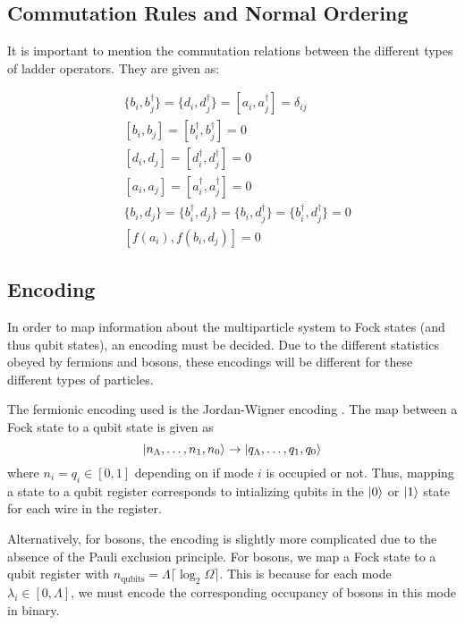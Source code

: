 \subsection{Commutation Rules and Normal Ordering}
\label{subsec:commutation}
It is important to mention the commutation relations between the different types of ladder operators. They are given as:

\begin{align*}
    &\{b_i, b_j^\dagger\} = \{d_i, d_j^\dagger\} = [a_i, a_j^\dagger] = \delta_{ij}\\
    & [b_i, b_j] = [b_i^\dagger, b_j^\dagger] = 0 \\
    & [d_i, d_j] = [d_i^\dagger, d_j^\dagger] = 0 \\
    & [a_i, a_j] = [a_i^\dagger, a_j^\dagger] = 0 \\
    & \{b_i, d_j\} = \{b_i^\dagger, d_j\} = \{b_i, d_j^\dagger\} = \{b_i^\dagger, d_j^\dagger\} = 0\\
    & [f(a_i), f(b_i, d_j)] = 0
\end{align*}

\subsection{Encoding}
\label{subsec:encoding}
In order to map information about the multiparticle system to Fock states (and thus qubit states), an encoding must be decided. Due to the different statistics obeyed by fermions and bosons, these encodings will be different for these different types of particles. 

The fermionic encoding used is the Jordan-Wigner encoding \cite{jordan-wigner}. The map between a Fock state to a qubit state is given as 
\begin{equation}
    \ket{n_\Lambda, \dots, n_1, n_0} \rightarrow \ket{q_\Lambda, \dots, q_1, q_0}
\end{equation}
where $n_i = q_i \in [0, 1]$ depending on if mode $i$ is occupied or not. Thus, mapping a state to a qubit register corresponds to intializing qubits in the $\ket{0}$ or $\ket{1}$ state for each wire in the register. 

Alternatively, for bosons, the encoding is slightly more complicated due to the absence of the Pauli exclusion principle. For bosons, we map a Fock state to a qubit register with $n_{\text{qubits}} = \Lambda \lceil \log_2{\Omega}\rceil$.
This is because for each mode $\lambda_i \in [0, \Lambda]$, we must encode the corresponding occupancy of bosons in this mode in binary. 

